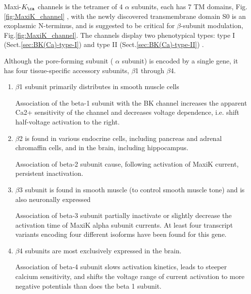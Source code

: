 Maxi-$K_\ca$ channels is the tetramer of 4 $\alpha$ subunits, each has 7
TM domains, Fig.\ref{fig:MaxiK_channel} \citep{toro1998}, with the newly
discovered transmembrane domain S0 is an exoplasmic N-terminus, and is suggested
to be critical for $\beta$-subunit modulation, Fig.\ref{fig:MaxiK_channel}.
The channels display two phenotypical types: type I
(Sect.\ref{sec:BK(Ca)-type-I}) and type II (Sect.\ref{sec:BK(Ca)-type-II})
\citep{calderone2002}.


Although the pore-forming subunit ( $\alpha$ subunit) is encoded by a single
gene, it has four tissue-specific accessory subunits, $\beta$1
through $\beta$4. 
\begin{enumerate}
  \item $\beta$1 subunit primarily distributes in smooth muscle cells

Association of the beta-1 subunit with the BK channel increases the apparent
Ca2+ sensitivity of the channel and decreases voltage dependence, i.e. shift
half-voltage activation to the right.

  \item $\beta$2 is found in  various endocrine cells, including pancreas and
  adrenal chromaffin cells, and in the brain, including hippocampus.

Association of beta-2 subunit cause, following activation of MaxiK current,
persistent inactivation.
  
  \item $\beta$3 subunit is found in smooth muscle (to control smooth muscle
  tone) and is also neuronally expressed
  
Association of beta-3 subunit  partially inactivate or slightly decrease the
activation time of MaxiK alpha subunit currents.  At least four transcript
variants encoding four different isoforms have been found for this gene.

  \item  $\beta$4 subunits are most exclusively expressed in the brain. 

Association of beta-4 subunit slows activation kinetics, leads to steeper
calcium sensitivity, and shifts the voltage range of current activation to
more negative potentials than does the beta 1 subunit.

\end{enumerate}
% 




